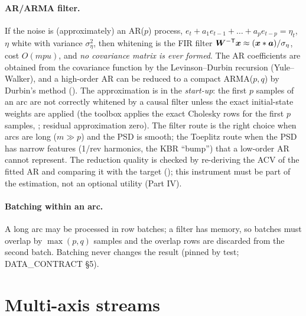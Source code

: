 \paragraph{AR/ARMA filter.} If the noise is (approximately) an AR($p$) process, $e_t + a_1 e_{t-1} + \dots + a_p e_{t-p} = \eta_t$, $\eta$ white with variance $\sigma_\eta^2$, then whitening is the FIR filter $\bm{W}^{-\mathsf T}\bm{x} \approx (\bm{x} * \bm{a})/\sigma_\eta$, cost $O(m p u)$, and \emph{no covariance matrix is ever formed}. The AR coefficients are obtained from the covariance function by the Levinson--Durbin recursion (Yule--Walker), and a high-order AR can be reduced to a compact ARMA($p,q$) by Durbin's method (). The approximation is in the \emph{start-up}: the first $p$ samples of an arc are not correctly whitened by a causal filter unless the exact initial-state weights are applied (the toolbox applies the exact Cholesky rows for the first $p$ samples, ; residual approximation zero). The filter route is the right choice when arcs are long ($m \gg p$) and the PSD is smooth; the Toeplitz route when the PSD has narrow features (1/rev harmonics, the KBR ``bump'') that a low-order AR cannot represent. The reduction quality is checked by re-deriving the ACV of the fitted AR and comparing it with the target (); this instrument must be part of the estimation, not an optional utility (Part IV).

\paragraph{Batching within an arc.} A long arc may be processed in row batches; a filter has memory, so batches must overlap by $\max(p,q)$ samples and the overlap rows are discarded from the second batch. Batching never changes the result (pinned by test; DATA\_CONTRACT §5).

\section{Multi-axis streams}
\label{sec:multiaxis}

